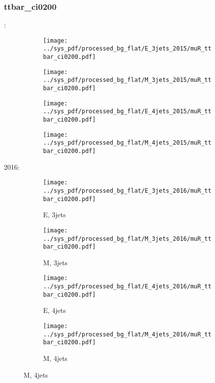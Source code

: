 \documentclass{beamer}
\begin{document}
\begin{frame}
\frametitle{ttbar_ci0200}
\fontsize{5}{1}:
\begin{figure}
\centering
\begin{subfigure}[b]{0.24\textwidth}
\texttt{[image: ../sys\_pdf/processed\_bg\_flat/E\_3jets\_2015/muR\_ttbar\_ci0200.pdf]}
\end{subfigure}
\begin{subfigure}[b]{0.24\textwidth}
\texttt{[image: ../sys\_pdf/processed\_bg\_flat/M\_3jets\_2015/muR\_ttbar\_ci0200.pdf]}
\end{subfigure}
\begin{subfigure}[b]{0.24\textwidth}
\texttt{[image: ../sys\_pdf/processed\_bg\_flat/E\_4jets\_2015/muR\_ttbar\_ci0200.pdf]}
\end{subfigure}
\begin{subfigure}[b]{0.24\textwidth}
\texttt{[image: ../sys\_pdf/processed\_bg\_flat/M\_4jets\_2015/muR\_ttbar\_ci0200.pdf]}
\end{subfigure}
\end{figure}
2016:
\begin{figure}
\centering
\begin{subfigure}[b]{0.24\textwidth}
\texttt{[image: ../sys\_pdf/processed\_bg\_flat/E\_3jets\_2016/muR\_ttbar\_ci0200.pdf]}
\captionsetup{font=tiny}
\caption{E, 3jets}
\end{subfigure}
\begin{subfigure}[b]{0.24\textwidth}
\texttt{[image: ../sys\_pdf/processed\_bg\_flat/M\_3jets\_2016/muR\_ttbar\_ci0200.pdf]}
\captionsetup{font=tiny}
\caption{M, 3jets}
\end{subfigure}
\begin{subfigure}[b]{0.24\textwidth}
\texttt{[image: ../sys\_pdf/processed\_bg\_flat/E\_4jets\_2016/muR\_ttbar\_ci0200.pdf]}
\captionsetup{font=tiny}
\caption{E, 4jets}
\end{subfigure}
\begin{subfigure}[b]{0.24\textwidth}
\texttt{[image: ../sys\_pdf/processed\_bg\_flat/M\_4jets\_2016/muR\_ttbar\_ci0200.pdf]}
\captionsetup{font=tiny}
\caption{M, 4jets}
\end{subfigure}
\end{figure}
\end{frame}
\end{document}
